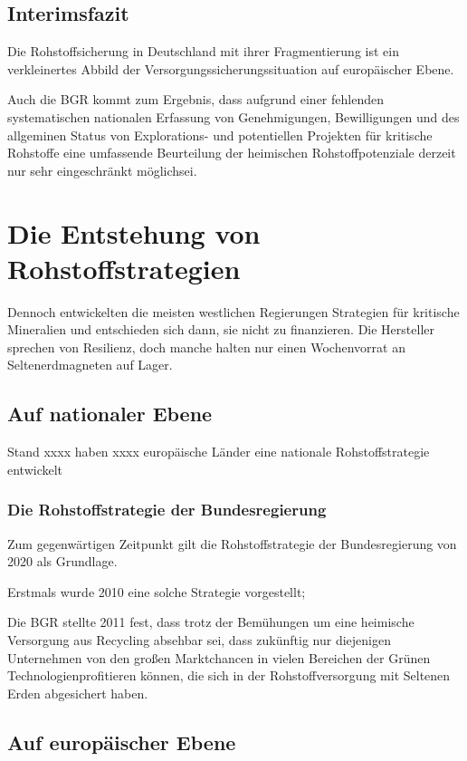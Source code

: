 \documentclass[12pt,a4paper,oneside]{book} %
\begin{document}
\subsection{Interimsfazit}
Die Rohstoffsicherung in Deutschland mit ihrer Fragmentierung ist ein verkleinertes Abbild der Versorgungssicherungssituation auf europäischer Ebene.

Auch die BGR kommt zum Ergebnis, dass aufgrund einer fehlenden systematischen nationalen Erfassung von Genehmigungen, Bewilligungen und des allgeminen Status von Explorations- und potentiellen Projekten für kritische Rohstoffe \glqq eine umfassende Beurteilung der heimischen Rohstoffpotenziale derzeit nur sehr eingeschränkt möglich\grqq sei.\autocite{Top Commodity News 73, S. 14}

\section{Die Entstehung von Rohstoffstrategien}

Dennoch entwickelten die meisten westlichen Regierungen Strategien für kritische Mineralien und entschieden sich dann, sie nicht zu finanzieren. Die Hersteller sprechen von Resilienz, doch manche halten nur einen Wochenvorrat an Seltenerdmagneten auf Lager.

\subsection{Auf nationaler Ebene}
Stand xxxx haben xxxx europäische Länder eine nationale Rohstoffstrategie entwickelt

\subsubsection{Die Rohstoffstrategie der Bundesregierung}
Zum gegenwärtigen Zeitpunkt gilt die Rohstoffstrategie der Bundesregierung von 2020 als Grundlage.

Erstmals wurde 2010 eine solche Strategie vorgestellt;

Die BGR stellte 2011 fest, dass trotz der Bemühungen um eine heimische Versorgung aus Recycling absehbar sei, dass \glqq zukünftig nur diejenigen Unternehmen von den großen Marktchancen in vielen Bereichen der 	\glq Grünen Technologien\grq profitieren können, die sich in der Rohstoffversorgung mit Seltenen Erden abgesichert haben\grqq.\autocite{Top Commodity News 36, S. 8}

\subsection{Auf europäischer Ebene}
\end{document}
